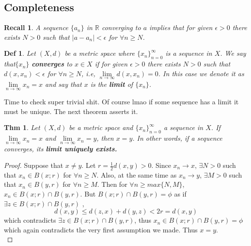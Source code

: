 \documentclass[paper=a4, fontsize=11pt]{scrartcl}
\newtheorem{theorem}{Thm}
\newtheorem{definition}{Def}
\newtheorem*{recall}{Recall}
\begin{document}
\subsection{Completeness}
\vspace{2.5ex}

\begin{recall}
	A sequence $\{a_n\}$ in $\mathbb{R}$ converging to $a$ implies that for given $\epsilon >0$ there exists $N>0$ such that $|a-a_n|<\epsilon$ for $\forall n\geq N$.\\
\end{recall}

\begin{definition}
	Let $(X,d)$ be a metric space where $\{x_n\}^\infty_{n=0}$ is a sequence in $X$. We say that$\{x_n\}$ \textbf{converges} to $x \in X$ if for given $\epsilon>0$ there exists $N>0$ such that $d(x,x_n)<\epsilon$ for $\forall n\geq N$, i.e, $\lim\limits_{n \to \infty} d(x,x_n)=0$. In this case we denote it as $\lim\limits_{n \to \infty} x_n = x$ and say that $x$ is the \textbf{limit} of $\{x_n\}$.  \\
\end{definition}

Time to check super trivial shit. Of course lmao if some sequence has a limit it must be unique. The next theorem asserts it.\\

\begin{theorem}
	Let $(X,d)$ be a metric space and $\{x_n\}^\infty_{n=0}$ a sequence in $X$. If $\lim\limits_{n \to \infty} x_n = x$ and $\lim\limits_{n \to \infty} x_n = y$, then $x=y$. In other words, if a sequence converges, its \textbf{limit uniquely exists.}\\
\end{theorem}

\begin{proof}
	Suppose that $x \neq y$. Let $r=\frac{1}{2} d(x,y) >0$. Since $x_n \to x$, $\exists N>0$ such that $x_n \in B(x;r)$ for $\forall n \geq N$. Also, at the same time as $x_n \to y$, $\exists M>0$ such that $x_n \in B(y,r)$ for $\forall n \geq M$. Then for $\forall n \geq max\{N,M\}$, $x_n \in B(x;r)\cap B(y,r)$. But $B(x;r)\cap B(y,r)=\phi$ as if $\exists z \in B(x;r)\cap B(y,r)$ ,
	\begin{equation} \nonumber
		d(x,y) \leq d(z,x) + d(y,z) < 2r = d(x,y)
	\end{equation} 
	which contradicts $\exists z \in B(x;r)\cap B(y,r)$, thus $x_n \in B(x;r)\cap B(y,r)=\phi$ which again contradicts the very first assumption we made. Thus $x=y$.\\
\end{proof}
\end{document}
